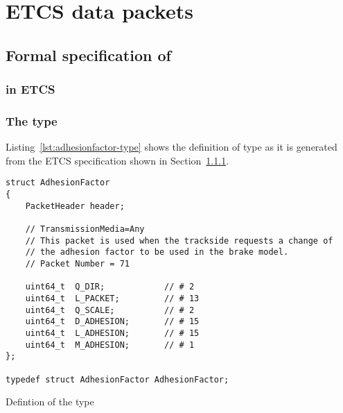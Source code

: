 

\chapter{ETCS data packets}
\label{sec:packets}

\section{Formal specification of \adhesion}
\label{sec:adhesionfactor}

\subsection{\adhesion in ETCS}
\label{sec:adhesionfactor-etcs}


\subsection{The type \adhesion}
\label{sec:adhesionfactor-type}

Listing~\ref{lst:adhesionfactor-type} shows the definition of type
\adhesion as it is generated from the ETCS specification shown in Section~\ref{sec:adhesionfactor-etcs}.

\begin{listing}[hbt]
\begin{minipage}{0.99\textwidth}
\begin{lstlisting}[style=acsl-block]
struct AdhesionFactor
{
    PacketHeader header;

    // TransmissionMedia=Any
    // This packet is used when the trackside requests a change of
    // the adhesion factor to be used in the brake model.
    // Packet Number = 71

    uint64_t  Q_DIR;            // # 2
    uint64_t  L_PACKET;         // # 13
    uint64_t  Q_SCALE;          // # 2
    uint64_t  D_ADHESION;       // # 15
    uint64_t  L_ADHESION;       // # 15
    uint64_t  M_ADHESION;       // # 1
};

typedef struct AdhesionFactor AdhesionFactor;
\end{lstlisting}
\end{minipage}
\caption{\label{lst:adhesionfactor-type}Defintion of the type \adhesion}
\end{listing}

\FloatBarrier  %

